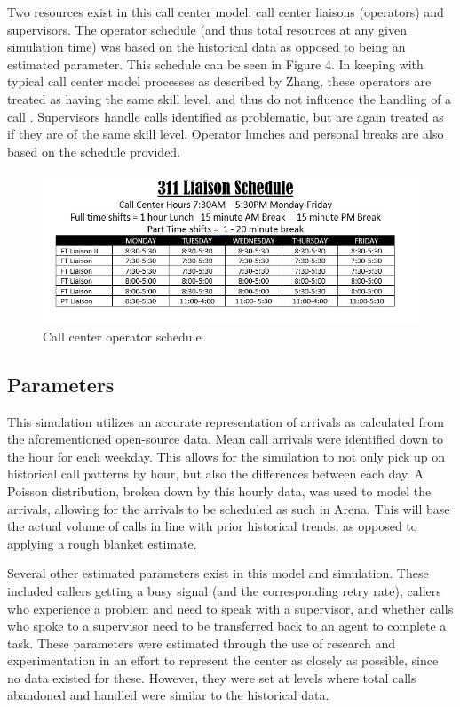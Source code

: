 \documentclass[12pt,twocolumn]{article}
\begin{document}
\par

Two resources exist in this call center model:  call center liaisons (operators) and supervisors.  The operator schedule (and thus total resources at any given simulation time) was based on the historical data as opposed to being an estimated parameter.  This schedule can be seen in Figure 4.  In keeping with typical call center model processes as described by Zhang, these operators are treated as having the same skill level, and thus do not influence the handling of a call \cite{zhang}.  Supervisors handle calls identified as problematic, but are again treated as if they are of the same skill level.  Operator lunches and personal breaks are also based on the schedule provided.

	\begin{figure}[h]
		\includegraphics[scale=.3]{schedule2.jpg}
		\caption{Call center operator schedule}
	\end{figure}
	
	\subsection{Parameters}
	
	
	This simulation utilizes an accurate representation of arrivals as calculated from the aforementioned open-source data.  Mean call arrivals were identified down to the hour for each weekday.  This allows for the simulation to not only pick up on historical call patterns by hour, but also the differences between each day.  A Poisson distribution, broken down by this hourly data, was used to model the arrivals, allowing for the arrivals to be scheduled as such in Arena.  This will base the actual volume of calls in line with prior historical trends, as opposed to applying a rough blanket estimate.
	
	\par
	
	Several other estimated parameters exist in this model and simulation.  These included callers getting a busy signal (and the corresponding retry rate), callers who experience a problem and need to speak with a supervisor, and whether calls who spoke to a supervisor need to be transferred back to an agent to complete a task.  These parameters were estimated through the use of research and experimentation in an effort to represent the center as closely as possible, since no data existed for these.  However, they were set at levels where total calls abandoned and handled were similar to the historical data.
	
\end{document}
